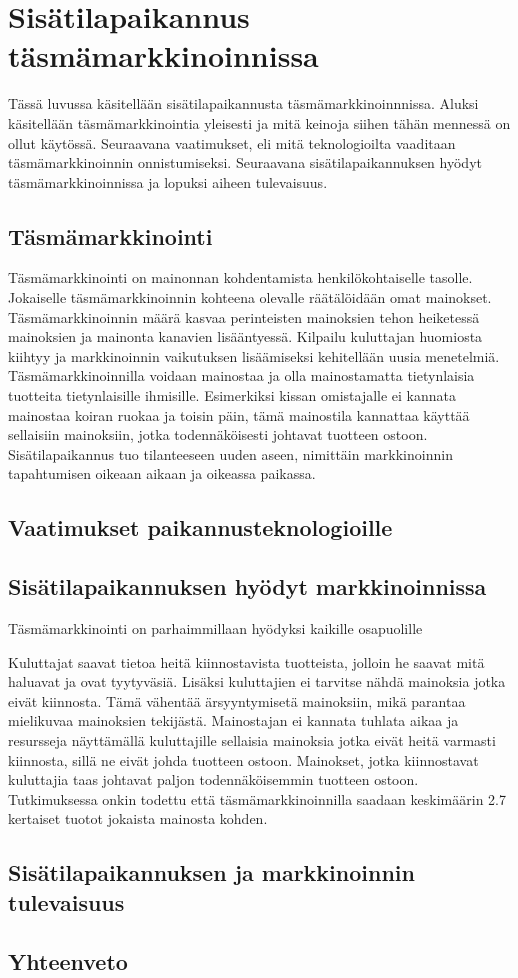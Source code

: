 \section{Sisätilapaikannus täsmämarkkinoinnissa}
Tässä luvussa käsitellään sisätilapaikannusta täsmämarkkinoinnnissa. Aluksi käsitellään täsmämarkkinointia yleisesti ja mitä keinoja siihen tähän mennessä on ollut käytössä. Seuraavana vaatimukset, eli mitä teknologioilta vaaditaan täsmämarkkinoinnin onnistumiseksi. Seuraavana sisätilapaikannuksen hyödyt täsmämarkkinoinnissa ja lopuksi aiheen tulevaisuus.
\subsection{Täsmämarkkinointi}
Täsmämarkkinointi on mainonnan kohdentamista henkilökohtaiselle tasolle. Jokaiselle täsmämarkkinoinnin kohteena olevalle räätälöidään omat mainokset. Täsmämarkkinoinnin määrä kasvaa perinteisten mainoksien tehon heiketessä mainoksien ja mainonta kanavien lisääntyessä\cite{tasma}. Kilpailu kuluttajan huomiosta kiihtyy ja markkinoinnin vaikutuksen lisäämiseksi kehitellään uusia menetelmiä.
Täsmämarkkinoinnilla voidaan mainostaa ja olla mainostamatta tietynlaisia tuotteita tietynlaisille ihmisille. Esimerkiksi kissan omistajalle ei kannata mainostaa koiran ruokaa ja toisin päin, tämä mainostila kannattaa käyttää sellaisiin mainoksiin, jotka todennäköisesti johtavat tuotteen ostoon. Sisätilapaikannus tuo tilanteeseen uuden aseen, nimittäin markkinoinnin tapahtumisen oikeaan aikaan ja oikeassa paikassa. 
\subsection{Vaatimukset paikannusteknologioille}
\subsection{Sisätilapaikannuksen hyödyt markkinoinnissa}
Täsmämarkkinointi on parhaimmillaan hyödyksi kaikille osapuolille


Kuluttajat saavat tietoa heitä kiinnostavista tuotteista, jolloin he saavat mitä haluavat ja ovat tyytyväsiä. Lisäksi kuluttajien ei tarvitse nähdä mainoksia jotka eivät kiinnosta. Tämä vähentää ärsyyntymisetä mainoksiin, mikä parantaa mielikuvaa mainoksien tekijästä. 
Mainostajan ei kannata tuhlata aikaa ja resursseja näyttämällä kuluttajille sellaisia mainoksia jotka eivät heitä varmasti kiinnosta, sillä ne eivät johda tuotteen ostoon. Mainokset, jotka kiinnostavat kuluttajia taas johtavat paljon todennäköisemmin tuotteen ostoon. Tutkimuksessa\cite{target} onkin todettu että täsmämarkkinoinnilla saadaan keskimäärin 2.7 kertaiset tuotot jokaista mainosta kohden.
\subsection{Sisätilapaikannuksen ja markkinoinnin tulevaisuus}
\subsection{Yhteenveto}

